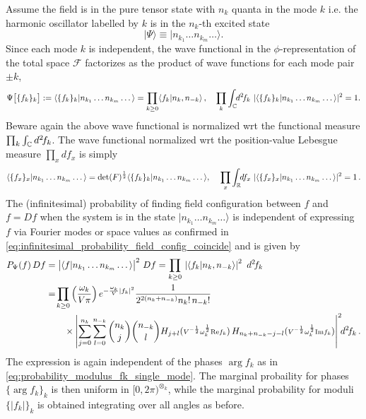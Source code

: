 \documentclass[../QFT_main.tex]{subfiles}
\begin{document}
\begin{mytheorem}
Assume the field is in the pure tensor state with $n_k$ quanta in the mode $k$ i.e. the harmonic oscillator labelled by $k$ is in the $n_k$-th excited state
\begin{equation}
    |\Psi\rangle \equiv |n_{k_1}\dots n_{k_m}\dots \rangle.
\end{equation}
%
Since each mode $k$ is independent, the wave functional in the $\phi$-representation of the total space $\mathcal{F}$ factorizes as the product of wave functions for each mode pair $\pm k$,
\begin{align}
    \Psi\big[\{f_k\}_k\big] := \langle \{f_k\}_k | n_{k_1}\dots n_{k_m}\dots \rangle= \prod_{k\geq0} \langle f_k | n_{k},n_{-k} \rangle\,,\quad \prod_k\int_{\mathbb{C}}\!\! d^2\!f_k\,\,|\langle \{f_k\}_k | n_{k_1}\dots n_{k_m}\dots \rangle|^2=1.
\end{align}
Beware again the above wave functional is normalized wrt the functional measure $\prod_k\int_{\mathbb{C}} d^2\!f_k$.
The wave functional normalized wrt the position-value Lebesgue measure $\prod_x df_x$ is simply
\begin{align}
    \langle \{f_x\}_x | n_{k_1}\dots n_{k_m}\dots \rangle = \det(F)^{\frac{1}{2}} \langle \{f_k\}_k | n_{k_1}\dots n_{k_m}\dots \rangle,\quad\, \prod_x \int_{\mathbb{R}} \!\!df_x \,\,|\langle \{f_x\}_x | n_{k_1}\dots n_{k_m}\dots \rangle|^2 = 1\,.
\end{align}
%
The (infinitesimal) probability of finding field configuration between $f$ and $f=Df$ when the system is in the state $|n_{k_1}\dots n_{k_m}\dots \rangle$ is independent of expressing $f$ via Fourier modes or space values as confirmed in \eqref{eq:infinitesimal_probability_field_config_coincide} and is given by
\begin{align}\label{eq:probability_density_field_configuration} 
    P_{\Psi}(f)\, Df &= \big|\langle f | n_{k_1}\dots n_{k_m}\dots \rangle \big|^2  \,\,Df
    =\prod_{k\geq0}\, \left|\langle f_k | n_{k},n_{-k} \rangle\right|^2\,\,d^2\!f_k
    \\
    &=\!
    \prod_{k\geq0}     
    \left( \frac{\omega_k}{V\pi} \right) e^{-\frac{\omega_k}{V} |f_k|^2} \frac{1}{2^{2(n_k + n_{-k})}n_k!\, n_{-k}!} 
    \\
    &\qquad \times
    \left| \sum_{j=0}^{n_k} \sum_{l=0}^{n_{-k}} \binom{n_k}{j} \binom{n_{-k}}{l}  H_{j+l}(\text{\scriptsize $V^{-\frac{1}{2}}\omega_k^{\frac{1}{2}}\text{Re}f_k$})\, H_{n_k + n_{-k} - j-l}(\text{\scriptsize $V^{-\frac{1}{2}}\omega_k^{\frac{1}{2}}\text{Im}f_k$}) \right|^2\! \!d^2\!f_k\,.
\end{align}
The expression is again independent of the phases $\arg \!f_k$ as in \eqref{eq:probability_modulus_fk_single_mode}.
The marginal probaility for phases $\{\arg \!f_k\}_k$ is then uniform in $[0,2\pi)^{\otimes_k}$, while the marginal probability for moduli $\{|f_k|\}_k$ is obtained integrating over all angles as before.


\end{mytheorem}
\end{document}
